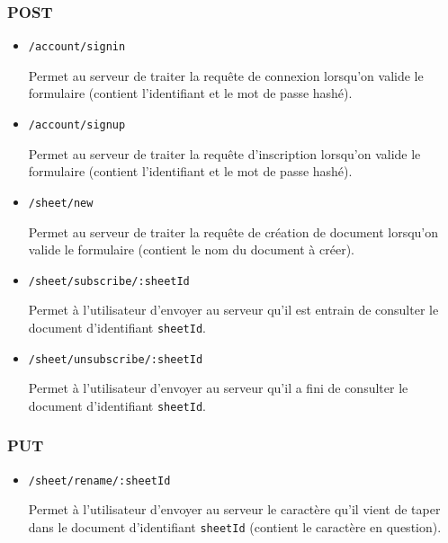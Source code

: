 \documentclass[11pt, letterpaper]{article}
\begin{document}
\subsubsection*{\textbf{POST}} 
\begin{itemize}
    \item \verb+/account/signin+

    Permet au serveur de traiter la requête de connexion lorsqu’on valide le formulaire (contient l’identifiant et le mot de passe hashé).

    \item \verb+/account/signup+

    Permet au serveur de traiter la requête d’inscription lorsqu’on valide le formulaire (contient l’identifiant et le mot de passe hashé).

    \item \verb+/sheet/new+

    Permet au serveur de traiter la requête de création de document lorsqu’on valide le formulaire (contient le nom du document à créer).

    \item \verb+/sheet/subscribe/:sheetId+

    Permet à l’utilisateur d’envoyer au serveur qu’il est entrain de consulter le document d’identifiant \verb+sheetId+.

    \item \verb+/sheet/unsubscribe/:sheetId+

    Permet à l’utilisateur d’envoyer au serveur qu’il a fini de consulter le document d’identifiant \verb+sheetId+.

\end{itemize}

\subsubsection*{\textbf{PUT}} 
\begin{itemize}
    \item \verb+/sheet/rename/:sheetId+

    Permet à l’utilisateur d’envoyer au serveur le caractère qu’il vient de taper dans le document d’identifiant \verb+sheetId+ (contient le caractère en question).

\end{itemize}
\end{document}
